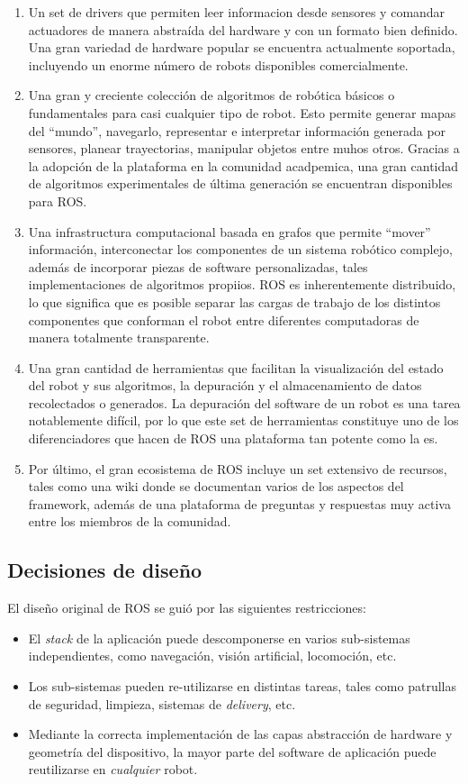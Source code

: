 \begin{enumerate}
    \item Un set de drivers que permiten leer informacion desde sensores y comandar actuadores de manera abstraída del hardware y con un formato bien definido. Una gran variedad de hardware popular se encuentra actualmente soportada, incluyendo un enorme número de robots disponibles comercialmente.
    \item Una gran y creciente colección de algoritmos de robótica básicos o fundamentales para casi cualquier tipo de robot. Esto permite generar mapas del ``mundo'', navegarlo, representar e interpretar información generada por sensores, planear trayectorias, manipular objetos entre muhos otros. Gracias a la adopción de la plataforma en la comunidad acadpemica, una gran cantidad de algoritmos experimentales de última generación se encuentran disponibles para ROS.
    \item Una infrastructura computacional basada en grafos que permite ``mover'' información, interconectar los componentes de un sistema robótico complejo, además de incorporar piezas de software personalizadas, tales implementaciones de algoritmos propiios. ROS es inherentemente distribuido, lo que significa que es posible separar las cargas de trabajo de los distintos componentes que conforman el robot entre diferentes computadoras de manera totalmente transparente.
    \item Una gran cantidad de herramientas que facilitan la visualización del estado del robot y sus algoritmos, la depuración y el almacenamiento de datos recolectados o generados. La depuración del software de un robot es una tarea notablemente difícil, por lo que este set de herramientas constituye uno de los diferenciadores que hacen de ROS una plataforma tan potente como la es.
    \item Por último, el gran ecosistema de ROS incluye un set extensivo de recursos, tales como una wiki donde se documentan varios de los aspectos del framework, además de una plataforma de preguntas y respuestas muy activa entre los miembros de la comunidad.
\end{enumerate}

\subsection{Decisiones de diseño}

El diseño original de ROS se guió por las siguientes restricciones:

\begin{itemize}
    \item El \textit{stack} de la aplicación puede descomponerse en varios sub-sistemas independientes, como navegación, visión artificial, locomoción, etc.
    \item Los sub-sistemas pueden re-utilizarse en distintas tareas, tales como patrullas de seguridad, limpieza, sistemas de \textit{delivery}, etc.
    \item Mediante la correcta implementación de las capas abstracción de hardware y geometría del dispositivo, la mayor parte del software de aplicación puede reutilizarse en \textit{cualquier} robot.
\end{itemize}

